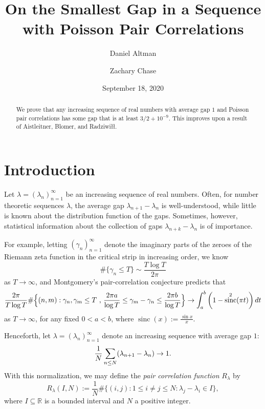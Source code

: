 \documentclass[12pt]{amsart}
\title{On the Smallest Gap in a Sequence with Poisson Pair Correlations}
\author{Daniel Altman \and Zachary Chase}
\date{September 18, 2020}
\theoremstyle{definition}
\newcommand{\vs}{\vspace{3mm}}
\newcommand{\R}{\mathbb{R}}
\newcommand{\lam}{\lambda}
\newcommand{\sub}{\subseteq}
\DeclareMathOperator{\sinc}{sinc}
\begin{document}
\begin{abstract}
We prove that any increasing sequence of real numbers with average gap $1$ and Poisson pair correlations has some gap that is at least $3/2+10^{-9}$. This improves upon a result of Aistleitner, Blomer, and Radziwi\l\l. 
\end{abstract}




\maketitle




\section{Introduction}\label{introduction}

Let $\lam = (\lam_n)_{n=1}^\infty$ be an increasing sequence of real numbers. Often, for number theoretic sequences $\lam$, the average gap $\lam_{n+1}-\lam_n$ is well-understood, while little is known about the distribution function of the gaps. Sometimes, however, statistical information about the collection of gaps $\lam_{n+k}-\lam_n$ is of importance.    

\vs

For example, letting $(\gamma_n)_{n=1}^\infty$ denote the imaginary parts of the zeroes of the Riemann zeta function in the critical strip in increasing order, we know $$\#\{\gamma_n \le T\} \sim \frac{T\log T}{2\pi}$$ as $T \to \infty$, and Montgomery's pair-correlation conjecture predicts that $$\frac{2\pi}{T\log T}\#\Big\{(n,m) : \gamma_n,\gamma_m \le T \text{ , } \frac{2\pi a}{\log T} \le \gamma_m-\gamma_n \le \frac{2\pi b}{\log T}\Big\} \to \int_a^b \left(1-\sinc^2(\pi t)\right)dt \vspace{2mm}$$ as $T \to \infty$, for any fixed $0 < a < b$, where $\sinc(x):= \frac{\sin x}{x}$. 

\vs

Henceforth, let $\lam = (\lam_n)_{n=1}^\infty$ denote an increasing sequence with average gap $1$: $$\frac{1}{N}\sum_{n \le N} (\lam_{n+1}-\lam_n) \to 1. \vspace{-1mm}$$ With this normalization, we may define the \textit{pair correlation function} $R_\lam$ by $$R_\lam(I,N) := \frac{1}{N}\#\Big\{(i,j) : 1 \le i \not = j \le N : \lambda_j-\lambda_i \in I\Big\},$$ where $I \sub \R$ is a bounded interval and $N$ a positive integer. 

\vs
\end{document}
